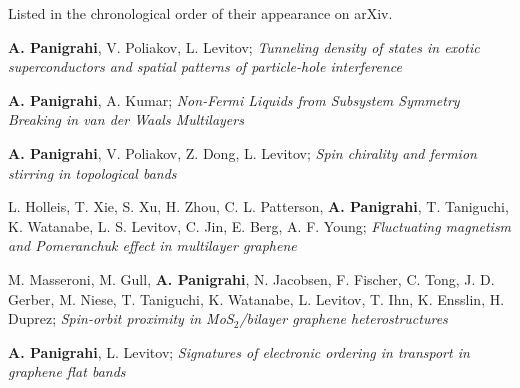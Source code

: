 

\begin{cventries}

  \cventry
    {Listed in the chronological order of their appearance on arXiv.} %
    {} %
    {} %
    {} %
    {
	  \begin{cvitems} %
	  	\item{\textbf{A. Panigrahi}, V. Poliakov, L. Levitov; \textit{Tunneling density of states in exotic superconductors and spatial patterns of particle-hole interference} }
	  	\item{\textbf{A. Panigrahi}, A. Kumar; \textit{Non-Fermi Liquids from Subsystem Symmetry Breaking in van der Waals Multilayers} }
	  	\item{\textbf{A. Panigrahi}, V. Poliakov, Z. Dong, L. Levitov; \textit{Spin chirality and fermion stirring in topological bands}
	  		}
	  	\item{L. Holleis, T. Xie, S. Xu, H. Zhou, C. L. Patterson, \textbf{A. Panigrahi}, T. Taniguchi, K. Watanabe, L. S. Levitov, C. Jin, E. Berg, A. F. Young; \textit{Fluctuating magnetism and Pomeranchuk effect in multilayer graphene}
	  	}
	  	\item{M. Masseroni, M. Gull, \textbf{A. Panigrahi}, N. Jacobsen, F. Fischer, C. Tong, J. D. Gerber, M. Niese, T. Taniguchi, K. Watanabe, L. Levitov, T. Ihn, K. Ensslin, H. Duprez; \textit{Spin-orbit proximity in MoS$_2$/bilayer graphene heterostructures}
	  		}
	  	\item{\textbf{A. Panigrahi}, L. Levitov; \textit{Signatures of electronic ordering in transport in graphene flat bands} }

\end{cvitems}}
\end{cventries}
